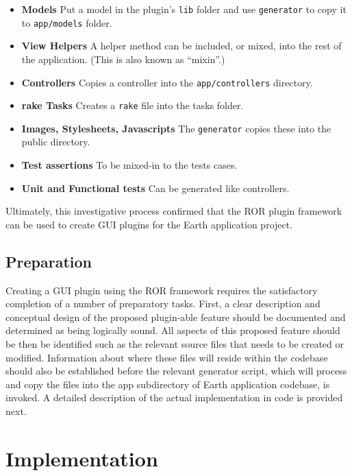 \documentclass{article}
\begin{document}
\begin{itemize}
    \item{\textbf{Models}} Put a model in the plugin’s \texttt{lib} folder and use \texttt{generator} to copy it to \texttt{app/models} folder.
    \item{\textbf{View Helpers}} A helper method can be included, or mixed, into the rest of the application. (This is also known as ``mixin''.) 
    \item{\textbf{Controllers}} Copies a controller into the \texttt{app/controllers} directory. 
    \item{\textbf{rake Tasks}} Creates a \texttt{rake} file into the tasks folder.
    \item{\textbf{Images, Stylesheets, Javascripts}} The \texttt{generator} copies these into the public directory.
    \item{\textbf{Test assertions}} To be mixed-in to the tests cases.
    \item{\textbf{Unit and Functional tests}} Can be generated like controllers.
\end{itemize}

Ultimately, this investigative process confirmed that the ROR plugin framework can be used to create GUI plugins for the Earth application project.


\subsection{Preparation} %

Creating a GUI plugin using the ROR framework requires the satisfactory completion of a number of preparatory tasks. First, a clear description and conceptual design of the proposed plugin-able feature should be documented and determined as being logically sound. All aspects of this proposed feature should be then be identified such as the relevant source files that needs to be created or modified. Information about where these files will reside within the codebase should also be established before the relevant generator script, which will process and copy the files into the app subdirectory of Earth application codebase, is invoked. A detailed description of the actual implementation in code is provided next.



\section{Implementation} %
\end{document}
